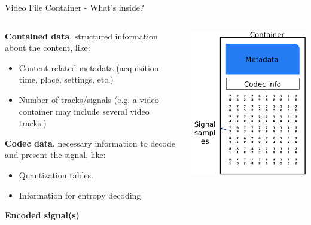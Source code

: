 \begin{tframe}{Video File Container - What's inside?}

\vspace{0.5cm}

\begin{minipage}{\textwidth}
\begin{columns}[T]

\begin{column}{0.55\textwidth}
\textbf{Contained data}, structured information about the content, like:
\begin{itemize}
\item Content-related metadata (acquisition time, place, settings, etc.)
\item Number of tracks/signals (e.g. a video container may include several video tracks.)
\end{itemize}

\textbf{Codec data}, necessary information to decode and present the signal, like:
\begin{itemize}
\item Quantization tables.
\item Information for entropy decoding
\end{itemize}

\textbf{Encoded signal(s)}
\end{column}

\begin{column}{0.45\textwidth}
\includegraphics[width=1\textwidth]{images/container.png}
\end{column}


\end{columns}
\end{minipage}
\end{tframe}
